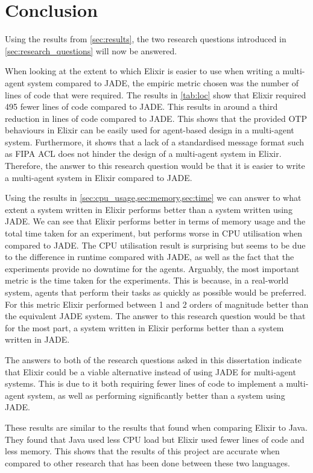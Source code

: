 \section{Conclusion}

Using the results from \cref{sec:results}, the two research questions introduced in \cref{sec:research_questions} will now be answered.

When looking at the extent to which Elixir is easier to use when writing a multi-agent system compared to JADE, the empiric metric chosen was the number of lines of code that were required.
The results in \cref{tab:loc} show that Elixir required 495 fewer lines of code compared to JADE\@.
This results in around a third reduction in lines of code compared to JADE\@.
This shows that the provided OTP behaviours in Elixir can be easily used for agent-based design in a multi-agent system.
Furthermore, it shows that a lack of a standardised message format such as FIPA ACL does not hinder the design of a multi-agent system in Elixir.
Therefore, the answer to this research question would be that it is easier to write a multi-agent system in Elixir compared to JADE\@.

Using the results in \cref{sec:cpu_usage,sec:memory,sec:time} we can answer to what extent a system written in Elixir performs better than a system written using JADE\@.
We can see that Elixir performs better in terms of memory usage and the total time taken for an experiment, but performs worse in CPU utilisation when compared to JADE\@.
The CPU utilisation result is surprising but seems to be due to the difference in runtime compared with JADE, as well as the fact that the experiments provide no downtime for the agents.
Arguably, the most important metric is the time taken for the experiments.
This is because, in a real-world system, agents that perform their tasks as quickly as possible would be preferred.
For this metric Elixir performed between 1 and 2 orders of magnitude better than the equivalent JADE system.
The answer to this research question would be that for the most part, a system written in Elixir performs better than a system written in JADE\@.

The answers to both of the research questions asked in this dissertation indicate that Elixir could be a viable alternative instead of using JADE for multi-agent systems.
This is due to it both requiring fewer lines of code to implement a multi-agent system, as well as performing significantly better than a system using JADE\@.

These results are similar to the results that  found when comparing Elixir to Java.
They found that Java used less CPU load but Elixir used fewer lines of code and less memory.
This shows that the results of this project are accurate when compared to other research that has been done between these two languages.


